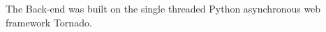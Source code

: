 \documentclass[../manual.tex]{subfiles}
\begin{document}
The Back-end was built on the single threaded Python asynchronous web framework Tornado.
\end{document}
